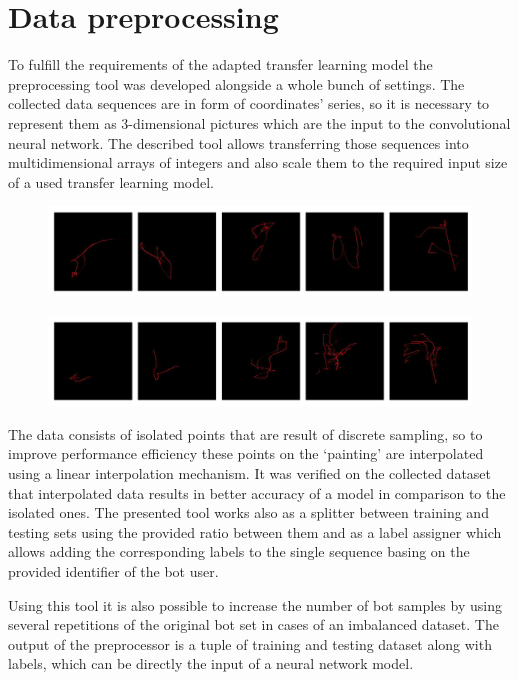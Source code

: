 \section{Data preprocessing}\label{sec:data-preprocessing}
To fulfill the requirements of the adapted transfer learning model the preprocessing tool was developed alongside a whole bunch of settings.
The collected data sequences are in form of coordinates' series, so it is necessary to represent them as 3-dimensional pictures which are the input to the convolutional neural network.
The described tool allows transferring those sequences into multidimensional arrays of integers and also scale them to the required input size of a used transfer learning model.

\begin{figure}[!hbt]
    \center
    \includegraphics[width=\linewidth]{resources/bot_sequences}
    \label{fig:bot_sequences}
\end{figure}
\begin{figure}[!hbt]
    \center
    \includegraphics[width=\linewidth]{resources/user_sequences}
    \label{fig:user_sequences}
\end{figure}


The data consists of isolated points that are result of discrete sampling, so to improve performance efficiency these points on the `painting' are interpolated using a linear interpolation mechanism.
It was verified on the collected dataset that interpolated data results in better accuracy of a model in comparison to the isolated ones.
The presented tool works also as a splitter between training and testing sets using the provided ratio between them and as a label assigner which allows adding the corresponding labels to the single sequence basing on the provided identifier of the bot user.

Using this tool it is also possible to increase the number of bot samples by using several repetitions of the original bot set in cases of an imbalanced dataset.
The output of the preprocessor is a tuple of training and testing dataset along with labels, which can be directly the input of a neural network model.